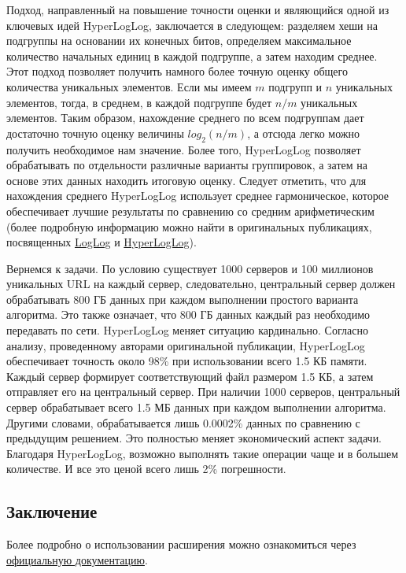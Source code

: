 Подход, направленный на повышение точности оценки и являющийся одной из ключевых идей HyperLogLog, заключается в следующем: разделяем хеши на подгруппы на основании их конечных битов, определяем максимальное количество начальных единиц в каждой подгруппе, а затем находим среднее. Этот подход позволяет получить намного более точную оценку общего количества уникальных элементов. Если мы имеем $m$ подгрупп и $n$ уникальных элементов, тогда, в среднем, в каждой подгруппе будет $n/m$ уникальных элементов. Таким образом, нахождение среднего по всем подгруппам дает достаточно точную оценку величины $log_2{(n/m)}$, а отсюда легко можно получить необходимое нам значение. Более того, HyperLogLog позволяет обрабатывать по отдельности различные варианты группировок, а затем на основе этих данных находить итоговую оценку. Следует отметить, что для нахождения среднего HyperLogLog использует среднее гармоническое, которое обеспечивает лучшие результаты по сравнению со средним арифметическим (более подробную информацию можно найти в оригинальных публикациях, посвященных \href{http://www.ic.unicamp.br/~celio/peer2peer/math/bitmap-algorithms/durand03loglog.pdf}{LogLog} и \href{http://algo.inria.fr/flajolet/Publications/FlFuGaMe07.pdf}{HyperLogLog}).

Вернемся к задачи. По условию существует 1000 серверов и 100 миллионов уникальных URL на каждый сервер, следовательно, центральный сервер должен обрабатывать 800 ГБ данных при каждом выполнении простого варианта алгоритма. Это также означает, что 800 ГБ данных каждый раз необходимо передавать по сети. HyperLogLog меняет ситуацию кардинально. Согласно анализу, проведенному авторами оригинальной публикации, HyperLogLog обеспечивает точность около 98\% при использовании всего 1.5 КБ памяти. Каждый сервер формирует соответствующий файл размером 1.5 КБ, а затем отправляет его на центральный сервер. При наличии 1000 серверов, центральный сервер обрабатывает всего 1.5 МБ данных при каждом выполнении алгоритма. Другими словами, обрабатывается лишь 0.0002\% данных по сравнению с предыдущим решением. Это полностью меняет экономический аспект задачи. Благодаря HyperLogLog, возможно выполнять такие операции чаще и в большем количестве. И все это ценой всего лишь 2\% погрешности.



\subsection{Заключение}

Более подробно о использовании расширения можно ознакомиться через \href{https://github.com/aggregateknowledge/postgresql-hll/blob/master/README.markdown}{официальную документацию}.
